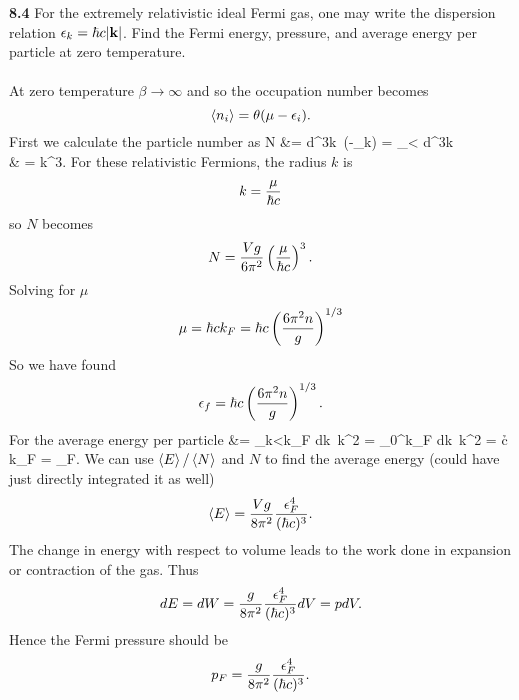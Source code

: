 \documentclass[11pt,letterpaper]{article}
\begin{document}
	\item[\textbf{8.4}]
		For the extremely relativistic ideal Fermi gas, one may write the dispersion relation 
		$\epsilon_k = \hbar c|\mathbf{k}|$. Find the Fermi energy, pressure, and average energy 
		per particle at zero temperature. 
		\\
		\\
		At zero temperature $\beta \to \infty$ and so the occupation number becomes
		\[
			\braket{n_i} = \theta(\mu-\epsilon_i).
		\]
		First we calculate the particle number as
		\ba
			N &= \int d^3k\ \theta(\mu-\epsilon_k) = 
			\int_{\epsilon<\mu} d^3k \\
			& = k^3.
		\ea
		For these relativistic Fermions, the radius $k$ is
		\[	
			k = \frac{\mu}{\hbar c} 
		\]
		so $N$ becomes 
		\[
			N = \frac{Vg}{6\pi^2}\left(\frac{\mu}{\hbar c}\right)^3.
		\]
		Solving for $\mu$
		\[
			\mu = \hbar c k_F = \hbar c\left(\frac{6\pi^2n}{g}\right)^{1/3}
		\]
		So we have found
		\[
			\epsilon_f = \hbar c\left(\frac{6\pi^2n}{g}\right)^{1/3}.
		\]
		For the average energy per particle
		\ba
			 &= 
			{\int_{k<k_F} dk\ k^2} 
			= 
			{\int_{0}^{k_F} dk\ k^2} = \h c k_F = \epsilon_F.
		\ea
		We can use $\braket E/\braket N$ and $N$ to find the average energy 
		(could have just directly integrated it as well)
		\[
			\braket{E} = \frac{Vg}{8\pi^2}\frac{\epsilon_F^4}{(\hbar c)^3}.
		\]
		The change in energy with respect to volume leads to the work done in expansion
		or contraction of the gas. Thus
		\[
			dE = dW = \frac{g}{8\pi^2}\frac{\epsilon_F^4}{(\hbar c)^3}dV = pdV.
		\]
		Hence the Fermi pressure should be
		\[
			p_F = \frac{g}{8\pi^2}\frac{\epsilon_F^4}{(\hbar c)^3}.
		\]
		
\eenum
\end{document}
